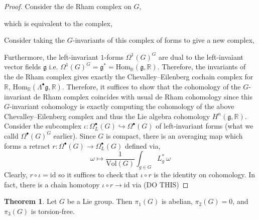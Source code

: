 \documentclass[12pt]{extarticle}
\newcommand{\Hom}[3]{\mathrm{Hom}_{#1}\left( #2, #3 \right)}
\newcommand{\R}{\mathbb{R}}
\newcommand{\id}{\mathrm{id}}
\theoremstyle{definition}
\newtheorem{theorem}{Theorem}[section]
\newcommand{\g}{\mathfrak{g}}
\newcommand{\embed}{\hookrightarrow}
\begin{document}
\begin{proof}
Consider the de Rham complex on $G$,
\begin{center}
\end{center}
which is equivalent to the complex,
\begin{center}
\end{center}
Consider taking the $G$-invariants of this complex of forms to give a new complex,
\begin{center}
\end{center}
Furthermore, the left-invariant $1$-forms $\Omega^1(G)^G$ are dual to the left-invaiant vector fields $\g$ i.e. $\Omega^1(G)^G = \g^* = \Hom{\R}{\g}{\R}$. Therefore, the invariants of the de Rham complex gives exactly the Chevalley–Eilenberg cochain complex for $\R$, $\Hom{\R}{\Lambda^\bullet \g}{\R}$. 
Therefore, it suffices to show that the cohomology of  the $G$-invariant de Rham complex coincides with usual de Rham cohomology since this $G$-invariant cohomology is exactly computing the cohomology of the above Chevalley–Eilenberg complex and thus the Lie algebra cohomology $H^n(\g, \R)$.  
\bigskip\\
Consider the subcomplex $\iota : \Omega_L^\bullet(G) \embed \Omega^\bullet(G)$ of left-invariant forms (what we calld $\Omega^\bullet(G)^G$ earlier). Since $G$ is compact, there is an averaging map which forms a retract $r : \Omega^\bullet(G) \to \Omega_L^\bullet(G)$ defined via,
\[ \omega \mapsto \frac{1}{\mathrm{Vol}(G)} \int_{g \in G} L^*_g \: \omega \]
Clearly, $r \circ \iota = \id$ so it suffices to check that $\iota \circ r$ is the identity on cohomology. In fact, there is a chain homotopy $\iota \circ r \to \id$ via (DO THIS)
\end{proof}

\begin{theorem}
Let $G$ be a Lie group. Then $\pi_1(G)$ is abelian, $\pi_2(G) = 0$, and $\pi_3(G)$ is torsion-free.
\end{theorem}
\end{document}
